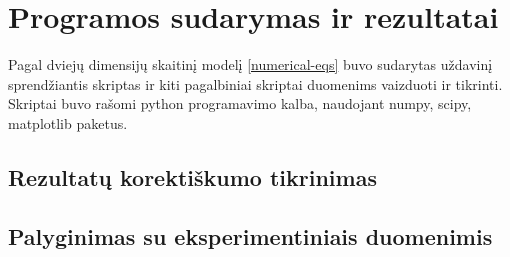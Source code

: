 \section{Programos sudarymas ir rezultatai}

Pagal dviejų dimensijų skaitinį modelį \eqref{numerical-eqs} buvo sudarytas uždavinį sprendžiantis skriptas ir kiti pagalbiniai skriptai duomenims vaizduoti ir tikrinti. Skriptai buvo rašomi python programavimo kalba, naudojant numpy, scipy, matplotlib paketus. 

\subsection{Rezultatų korektiškumo tikrinimas}
\subsection{Palyginimas su eksperimentiniais duomenimis}
